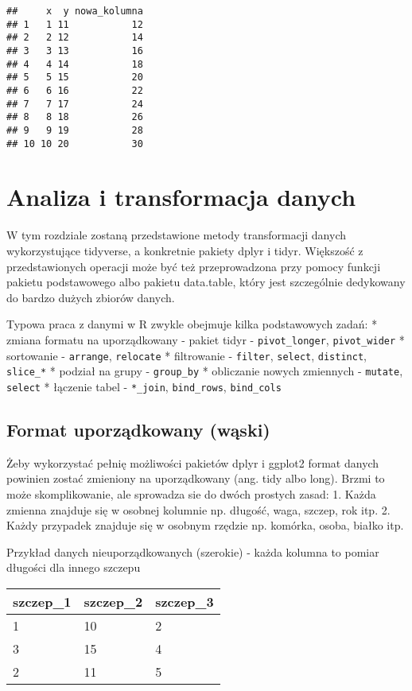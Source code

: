 \documentclass[
]{book}
\begin{document}
\begin{verbatim}
##     x  y nowa_kolumna
## 1   1 11           12
## 2   2 12           14
## 3   3 13           16
## 4   4 14           18
## 5   5 15           20
## 6   6 16           22
## 7   7 17           24
## 8   8 18           26
## 9   9 19           28
## 10 10 20           30
\end{verbatim}

\hypertarget{analiza-i-transformacja-danych}{%
\chapter{Analiza i transformacja danych}\label{analiza-i-transformacja-danych}}

W tym rozdziale zostaną przedstawione metody transformacji danych wykorzystujące tidyverse, a konkretnie pakiety dplyr i tidyr. Większość z przedstawionych operacji może być też przeprowadzona przy pomocy funkcji pakietu podstawowego albo pakietu data.table, który jest szczególnie dedykowany do bardzo dużych zbiorów danych.

Typowa praca z danymi w R zwykle obejmuje kilka podstawowych zadań:
* zmiana formatu na uporządkowany - pakiet tidyr - \texttt{pivot\_longer}, \texttt{pivot\_wider}
* sortowanie - \texttt{arrange}, \texttt{relocate}
* filtrowanie - \texttt{filter}, \texttt{select}, \texttt{distinct}, \texttt{slice\_*}
* podział na grupy - \texttt{group\_by}
* obliczanie nowych zmiennych - \texttt{mutate}, \texttt{select}
* łączenie tabel - \texttt{*\_join}, \texttt{bind\_rows}, \texttt{bind\_cols}

\hypertarget{format-uporzux105dkowany-wux105ski}{%
\section{Format uporządkowany (wąski)}\label{format-uporzux105dkowany-wux105ski}}

Żeby wykorzystać pełnię możliwości pakietów dplyr i ggplot2 format danych powinien zostać zmieniony na uporządkowany (ang. tidy albo long). Brzmi to może skomplikowanie, ale sprowadza sie do dwóch prostych zasad:
1. Każda zmienna znajduje się w osobnej kolumnie np. długość, waga, szczep, rok itp.
2. Każdy przypadek znajduje się w osobnym rzędzie np. komórka, osoba, białko itp.

Przykład danych nieuporządkowanych (szerokie) - każda kolumna to pomiar długości dla innego szczepu

\begin{longtable}[]{@{}lll@{}}
\toprule
szczep\_1 & szczep\_2 & szczep\_3 \\
\midrule
\endhead
1 & 10 & 2 \\
3 & 15 & 4 \\
2 & 11 & 5 \\
\bottomrule
\end{longtable}
\end{document}
